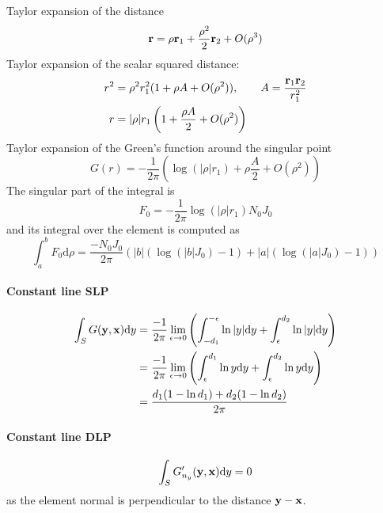 \documentclass[a4paper,11pt]{article}
\newcommand{\td}{\mathrm{d}}
\begin{document}
Taylor expansion of the distance
%
\begin{equation}
	{\bf r} = \rho {\bf r}_1 + \frac{\rho^2}{2} {\bf r}_2 + O(\rho^3)
\end{equation}
%
Taylor expansion of the scalar squared distance:
%
\begin{align}
	r^2 &= \rho^2 r_1^2 (1 + \rho A + O(\rho^2)), \qquad A = \frac{{\bf r}_1 {\bf r}_2}{r_1^2} \\
	r &= |\rho| r_1 \left(1 + \frac{\rho A}{2} + O(\rho^2)\right)
\end{align}
%
Taylor expansion of the Green's function around the singular point
%
\begin{equation}
	G(r) = -\frac{1}{2\pi} \left(
		\log (|\rho| r_1) + \rho \frac{A}{2} + O(\rho^2)
		\right)
\end{equation}
%
The singular part of the integral is
%
\begin{equation}
	F_0 = -\frac{1}{2\pi} \log \left(|\rho| r_1\right) N_0 J_0
\end{equation}
%
and its integral over the element is computed as
%
\begin{equation}
	\int_{a}^b F_0 \td\rho
	= \frac{-N_0 J_0}{2\pi} \left(|b|(\log(|b| J_0) - 1) + |a|(\log(|a| J_0) - 1) \right)
\end{equation}

\paragraph{Constant line SLP}

\begin{align}
\int_{S} G({\bf y}, {\bf x}) \td y
& = \frac{-1}{2\pi}\lim_{\epsilon \to 0}
\left( \int_{-d_1}^{-\epsilon} \ln |y| \td y + \int_{\epsilon}^{d_2}  \ln |y| \td y \right) \nonumber \\
& = \frac{-1}{2\pi}\lim_{\epsilon \to 0}
\left( \int_{\epsilon}^{d_1} \ln y \td y + \int_{\epsilon}^{d_2}  \ln y \td y \right) \nonumber \\
&=
\frac{d_1(1-\ln d_1) + d_2(1-\ln d_2)}{2\pi}
\end{align}

\paragraph{Constant line DLP}

\begin{equation}
\int_{S} G'_{n_y}({\bf y}, {\bf x}) \td y = 0
\end{equation}
%
as the element normal is perpendicular to the distance ${\bf y}-{\bf x}$.
\end{document}
